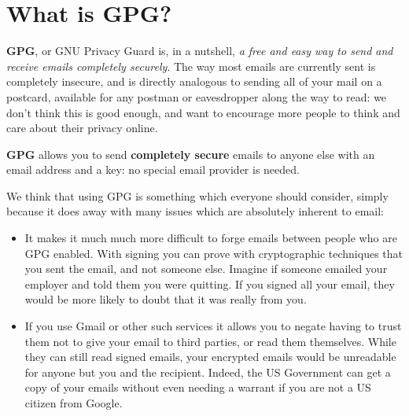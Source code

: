 

\section{What is GPG?}

\textbf{GPG}, or GNU Privacy Guard is, in a nutshell, \textit{a free and easy way to send and receive emails completely securely}. The way most emails are currently sent is completely insecure, and is directly analogous to sending all of your mail on a postcard, available for any postman or eavesdropper along the way to read: we don't think this is good enough, and want to encourage more people to think and care about their privacy online.

\textbf{GPG} allows you to send \textbf{completely secure} emails to anyone else with an email address and a key: no special email provider is needed.

We think that using GPG is something which everyone should consider, simply because it does away with many issues which are absolutely inherent to email:

\begin{itemize}
	\item It makes it much much more difficult to forge emails between people who are GPG enabled. With signing you can prove with cryptographic techniques that you sent the email, and not someone else. Imagine if someone emailed your employer and told them you were quitting. If you signed all your email, they would be more likely to doubt that it was really from you.
	\item If you use Gmail or other such services it allows you to negate having to trust them not to give your email to third parties, or read them themselves. While they can still read signed emails, your encrypted emails would be unreadable for anyone but you and the recipient. Indeed, the US Government can get a copy of your emails without even needing a warrant if you are not a US citizen from Google.  
\end{itemize}

